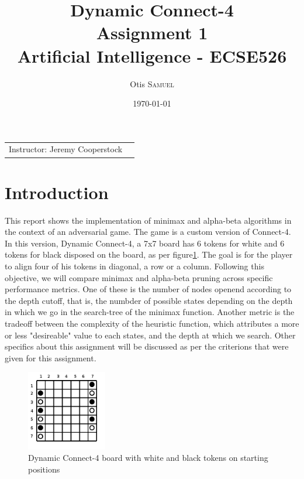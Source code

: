 \documentclass{article}
\title{Dynamic Connect-4 \\ Assignment 1 \\ Artificial Intelligence - ECSE526} %
\author{Otis \textsc{Samuel}} %
\date{\today} %
\begin{document}
\maketitle %

\begin{center}
\begin{tabular}{l r}
Instructor: Jeremy Cooperstock %
\end{tabular}
\end{center}


\section{Introduction}
This report shows the implementation of minimax and alpha-beta algorithms in the context of an adversarial game. The game is a custom version of Connect-4. In this version, Dynamic Connect-4, a 7x7 board has 6 tokens for white and 6 tokens for black disposed on the board, as per figure\ref{fig:dc4}. The goal is for the player to align four of his tokens in diagonal, a row or a column. Following this objective, we will compare minimax and alpha-beta pruning across specific performance metrics. One of these is the number of nodes openend according to the depth cutoff, that is, the numbder of possible states depending on the depth in which we go in the search-tree of the minimax function. Another metric is the tradeoff between the complexity of the heuristic function, which attributes a more or less "desireable" value to each states, and the depth at which we search. Other specifics about this assignment will be discussed as per the criterions that were given for this assignment.
	\begin{figure}
		\hfill\includegraphics[height=3.5cm]{dyncon4.png}\hspace*{\fill}
		\caption{ Dynamic Connect-4 board with white and black tokens on starting positions}
		\label{fig:dc4}
	\end{figure}
	
\end{document}

